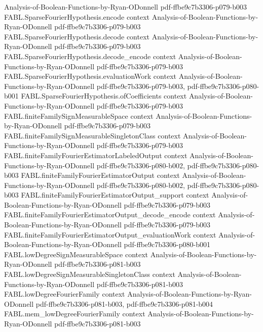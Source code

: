 \begin{theorem}
  {Analysis-of-Boolean-Functions-by-Ryan-ODonnell}
  {pdf-ffbe9c7b3306-p079-b003}
\proofstep
  {FABL.SparseFourierHypothesis.encode}
  {context}
  {Analysis-of-Boolean-Functions-by-Ryan-ODonnell}
  {pdf-ffbe9c7b3306-p079-b003}
\proofstep
  {FABL.SparseFourierHypothesis.decode}
  {context}
  {Analysis-of-Boolean-Functions-by-Ryan-ODonnell}
  {pdf-ffbe9c7b3306-p079-b003}
\proofstep
  {FABL.SparseFourierHypothesis.decode_encode}
  {context}
  {Analysis-of-Boolean-Functions-by-Ryan-ODonnell}
  {pdf-ffbe9c7b3306-p079-b003}
\proofstep
  {FABL.SparseFourierHypothesis.evaluationWork}
  {context}
  {Analysis-of-Boolean-Functions-by-Ryan-ODonnell}
  {pdf-ffbe9c7b3306-p079-b003,
    pdf-ffbe9c7b3306-p080-b001}
\proofstep
  {FABL.SparseFourierHypothesis.ofCoefficients}
  {context}
  {Analysis-of-Boolean-Functions-by-Ryan-ODonnell}
  {pdf-ffbe9c7b3306-p079-b003}
\proofstep
  {FABL.finiteFamilySignMeasurableSpace}
  {context}
  {Analysis-of-Boolean-Functions-by-Ryan-ODonnell}
  {pdf-ffbe9c7b3306-p079-b003}
\proofstep
  {FABL.finiteFamilySignMeasurableSingletonClass}
  {context}
  {Analysis-of-Boolean-Functions-by-Ryan-ODonnell}
  {pdf-ffbe9c7b3306-p079-b003}
\proofstep
  {FABL.finiteFamilyFourierEstimatorLabeledOutput}
  {context}
  {Analysis-of-Boolean-Functions-by-Ryan-ODonnell}
  {pdf-ffbe9c7b3306-p080-b002,
    pdf-ffbe9c7b3306-p080-b003}
\proofstep
  {FABL.finiteFamilyFourierEstimatorOutput}
  {context}
  {Analysis-of-Boolean-Functions-by-Ryan-ODonnell}
  {pdf-ffbe9c7b3306-p080-b002,
    pdf-ffbe9c7b3306-p080-b003}
\proofstep
  {FABL.finiteFamilyFourierEstimatorOutput_support}
  {context}
  {Analysis-of-Boolean-Functions-by-Ryan-ODonnell}
  {pdf-ffbe9c7b3306-p079-b003}
\proofstep
  {FABL.finiteFamilyFourierEstimatorOutput_decode_encode}
  {context}
  {Analysis-of-Boolean-Functions-by-Ryan-ODonnell}
  {pdf-ffbe9c7b3306-p079-b003}
\proofstep
  {FABL.finiteFamilyFourierEstimatorOutput_evaluationWork}
  {context}
  {Analysis-of-Boolean-Functions-by-Ryan-ODonnell}
  {pdf-ffbe9c7b3306-p080-b001}
\proofstep
  {FABL.lowDegreeSignMeasurableSpace}
  {context}
  {Analysis-of-Boolean-Functions-by-Ryan-ODonnell}
  {pdf-ffbe9c7b3306-p081-b003}
\proofstep
  {FABL.lowDegreeSignMeasurableSingletonClass}
  {context}
  {Analysis-of-Boolean-Functions-by-Ryan-ODonnell}
  {pdf-ffbe9c7b3306-p081-b003}
\proofstep
  {FABL.lowDegreeFourierFamily}
  {context}
  {Analysis-of-Boolean-Functions-by-Ryan-ODonnell}
  {pdf-ffbe9c7b3306-p081-b003,
    pdf-ffbe9c7b3306-p081-b004}
\proofstep
  {FABL.mem_lowDegreeFourierFamily}
  {context}
  {Analysis-of-Boolean-Functions-by-Ryan-ODonnell}
  {pdf-ffbe9c7b3306-p081-b003}

\end{theorem}
